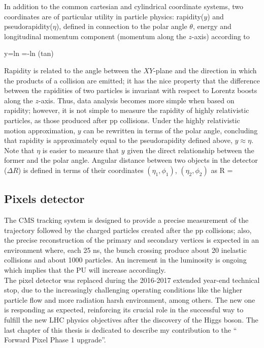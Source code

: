 \noindent In addition to the common cartesian and cylindrical coordinate systems, two coordinates are of particular utility in particle physics: rapidity($y$) and pseudorapidity($\eta$), defined in connection to the polar angle $\theta$, energy and longitudinal momentum component (momentum along the $z$-axis) according to

\beqn
y=ln \qquad \eta=-ln \left(tan\right)
\label{eqn:eta}
\eeqn

\noindent Rapidity is related to the angle between the $XY$-plane and the direction in which the products of a collision are emitted; it has the nice property that the difference between the rapidities of two particles is invariant with respect to Lorentz boosts along the $z$-axis. Thus, data analysis becomes more simple when based on rapidity; however, it is not simple to measure the rapidity of highly relativistic particles, as those produced after pp collisions. Under the highly relativistic motion approximation, $y$ can be rewritten in terms of the polar angle, concluding that rapidity is approximately equal to the pseudorapidity defined above, \ie $y\approx\eta$. Note that $\eta$ is easier to measure that $y$ given the direct relationship between the former and the polar angle. Angular distance between two objects in the detector ($\Delta R$) is defined in terms of their coordinates $(\eta_1,\phi_1)$, $(\eta_2,\phi_2)$ as
\beqn
\Delta R = 
\eeqn

\subsection{Pixels detector}

\noindent  The CMS tracking system is designed to provide a precise measurement of the trajectory followed by the charged particles created after the pp collisions; also, the precise reconstruction of the primary and secondary vertices is expected in an environment where, each 25 ns, the bunch crossing produce about 20 inelastic collisions and about 1000 particles. An increment in the luminosity is ongoing which implies that the PU will increase accordingly. \\

\noindent The pixel detector was replaced during the 2016-2017 extended year-end technical stop, due to the increasingly challenging operating conditions like the higher particle flow and more radiation harsh environment, among others. The new one is responding as expected, reinforcing its crucial role in the successful way to fulfill the new LHC physics objectives after the discovery of the Higgs boson. The last chapter of this thesis is dedicated to describe my contribution to the `` Forward Pixel Phase 1 upgrade''.\\

